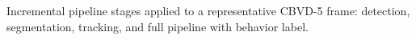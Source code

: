 \caption{Incremental pipeline stages applied to a representative CBVD-5 frame: detection, segmentation, tracking, and full pipeline with behavior label.}\label{fig:pipeline-progression-cbvd5}
